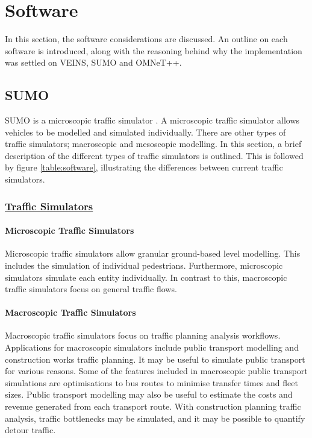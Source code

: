 \section{Software}
In this section, the software considerations are discussed. An outline on each software is introduced, along with the reasoning behind why the implementation was settled on VEINS, SUMO and OMNeT++.

\subsection{SUMO}\label{ssec:SUMO_SOFTWARE}
SUMO is a microscopic traffic simulator \citep{SUMO2012}. A microscopic traffic simulator allows vehicles to be modelled and simulated individually. There are other types of traffic simulators; macroscopic and mesoscopic modelling. In this section, a brief description of the different types of traffic simulators is outlined. This is followed by figure \ref{table:software}, illustrating the differences between current traffic simulators.

\subsubsection{\underline{Traffic Simulators}}
\paragraph{Microscopic Traffic Simulators}
Microscopic traffic simulators allow granular ground-based level modelling. This includes the simulation of individual pedestrians. Furthermore, microscopic simulators simulate each entity individually. In contrast to this, macroscopic traffic simulators focus on general traffic flows. 

\paragraph{Macroscopic Traffic Simulators}
Macroscopic traffic simulators focus on traffic planning analysis workflows. Applications for macroscopic simulators include public transport modelling and construction works traffic planning. It may be useful to simulate public transport for various reasons. Some of the features included in macroscopic public transport simulations are optimisations to bus routes to minimise transfer times and fleet sizes. Public transport modelling may also be useful to estimate the costs and revenue generated from each transport route. With construction planning traffic analysis, traffic bottlenecks may be simulated, and it may be possible to quantify detour traffic.


